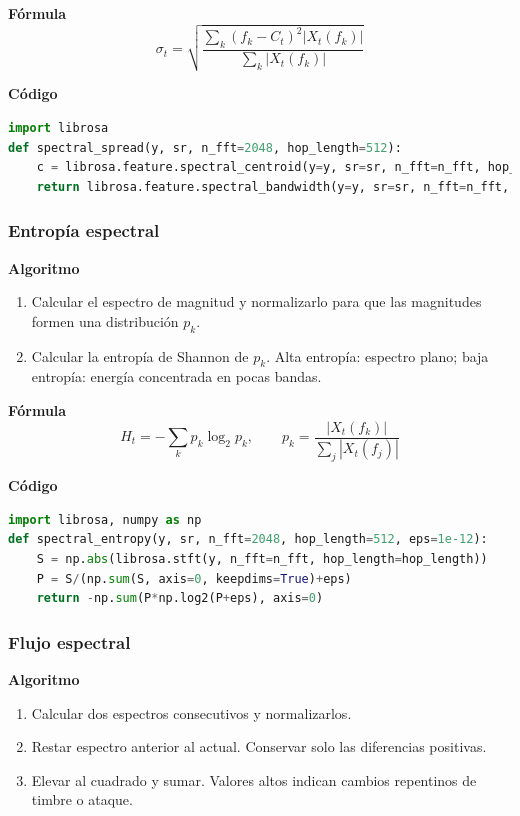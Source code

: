 \textbf{Fórmula}
\[
  \sigma_t=\sqrt{\frac{\sum_k (f_k-C_t)^2|X_t(f_k)|}{\sum_k|X_t(f_k)|}}
\]

\textbf{Código}
\begin{lstlisting}[language=Python, label={lst:spread_code}, caption={Dispersión espectral}]
import librosa
def spectral_spread(y, sr, n_fft=2048, hop_length=512):
    c = librosa.feature.spectral_centroid(y=y, sr=sr, n_fft=n_fft, hop_length=hop_length)
    return librosa.feature.spectral_bandwidth(y=y, sr=sr, n_fft=n_fft, hop_length=hop_length, centroid=c, p=2)[0]
\end{lstlisting}

\subsubsection{Entropía espectral}
\textbf{Algoritmo} \parencite{peeters2004large, muller2015fmp}
\begin{enumerate}
  \item Calcular el espectro de magnitud y normalizarlo para que las magnitudes formen una distribución \(p_k\).
  \item Calcular la entropía de Shannon de \(p_k\). Alta entropía: espectro plano; baja entropía: energía concentrada en pocas bandas.
\end{enumerate}

\textbf{Fórmula}
\[
  H_t=-\sum_{k} p_k\log_2 p_k,\qquad p_k=\frac{|X_t(f_k)|}{\sum_{j}|X_t(f_j)|}
\]

\textbf{Código}
\begin{lstlisting}[language=Python, label={lst:spec_entropy}, caption={Entropía espectral}]
import librosa, numpy as np
def spectral_entropy(y, sr, n_fft=2048, hop_length=512, eps=1e-12):
    S = np.abs(librosa.stft(y, n_fft=n_fft, hop_length=hop_length))
    P = S/(np.sum(S, axis=0, keepdims=True)+eps)
    return -np.sum(P*np.log2(P+eps), axis=0)
\end{lstlisting}

\subsubsection{Flujo espectral}
\textbf{Algoritmo} \parencite{muller2015fmp}
\begin{enumerate}
  \item Calcular dos espectros consecutivos y normalizarlos.
  \item Restar espectro anterior al actual. Conservar solo las diferencias positivas.
  \item Elevar al cuadrado y sumar. Valores altos indican cambios repentinos de timbre o ataque.
\end{enumerate}

